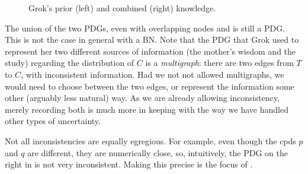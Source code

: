 \documentclass[letterpaper]{article} %
\newcommand\cmergearr[4]{
		\draw[arr,-] (#1) -- (#4) -- (#2);
		\draw[arr, shorten <=0] (#4) -- (#3);
	}
\newcommand\mergearr[3]{
		\coordinate (center-#1#2#3) at (barycentric cs:#1=1,#2=1,#3=1.2);
		\cmergearr{#1}{#2}{#3}{center-#1#2#3}
	}
\theoremstyle{plain}
\theoremstyle{definition}
\theoremstyle{remark}
\newcommand\mat[1]{\mathbf{#1}}
\begin{document}
\begin{example}
\begin{figure}
{
	}
	\caption{Grok's prior (left) and combined (right) knowledge.}
	\label{fig:grok-combine}
\end{figure}

The union of the two PDGs, even with overlapping nodes and is still a PDG. This
is not the case in general with a BN. Note that the PDG that Grok used to
represent her two different sources of information (the mother's wisdom and the
study) regarding the distribution of $C$ is a \emph{multigraph}: there are two
edges from $T$ to $C$, with inconsistent information. Had we not not allowed
multigraphs, we would need to choose between the two edges, or represent the
information some other (arguably less natural) way. As we are already allowing
inconsistency, merely recording both is much more in keeping with the way we
have handled other types of uncertainty. 
%		
\end{example}

Not all inconsistencies are equally egregious. For example, even though the cpds
$p$ and $q$ are different, they are numerically close, so, intuitively, the PDG on the right in
 is not very inconsistent.
Making this precise 
is
the focus of .
\end{document}
